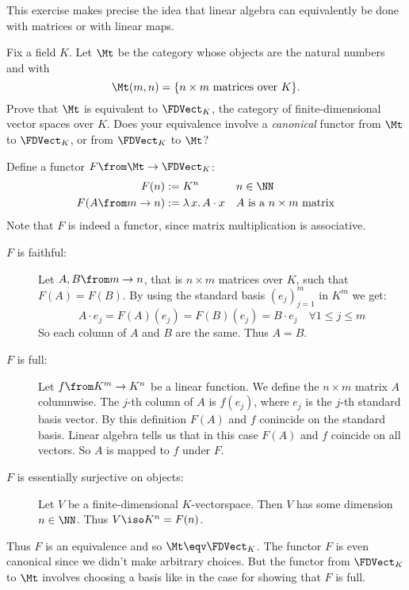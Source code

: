 \begin{exercise}
This exercise makes precise the idea that linear algebra can equivalently
be done with matrices or with linear maps.

Fix a field $K$.  Let $\Mt$ be the category whose objects are the natural
numbers and with
\[ \Mt(m, n) = \{ n \times m \text{ matrices over } K \}. \]
Prove that $\Mt$ is equivalent to $\FDVect_K$, the category of
finite-dimensional vector spaces over $K$.
Does your equivalence involve a \emph{canonical} functor from $\Mt$ to $\FDVect_K$, or from $\FDVect_K$ to $\Mt$?
\end{exercise}
\begin{answer}
    Define a functor $F\from \Mt \to \FDVect_K$:
    \begin{align*}
        F(n) & := K^n && n \in \NN\\
        F(A\from m \to n) & := \lambda\, x. \, A \cdot x && A \text{ is a } n \times m \text{ matrix}
    \end{align*}
    Note that $F$ is indeed a functor, since matrix multiplication is associative.
    \begin{description}
        \item[$F$ is faithful:]
            Let $A, B\from m \to n$, that is $n \times m$ matrices over $K$, such that $F(A) = F(B)$.
            By using the standard basis $(e_j)_{j = 1}^m$ in $K^m$ we get:
            \[A \cdot e_j = F(A)(e_j) = F(B)(e_j) = B \cdot e_j \quad\forall 1 \le j \le m\]
            So each column of $A$ and $B$ are the same.
            Thus $A = B$.
        \item[$F$ is full:]
            Let $f\from K^m \to K^n$ be a linear function.
            We define the $n \times m$ matrix $A$ columnwise.
            The $j$-th column of $A$ is $f(e_j)$, where $e_j$ is the $j$-th standard basis vector.
            By this definition $F(A)$ and $f$ conincide on the standard basis.
            Linear algebra tells us that in this case $F(A)$ and $f$ coincide on all vectors.
            So $A$ is mapped to $f$ under $F$.
        \item[$F$ is essentially surjective on objects:]
            Let $V$ be a finite-dimensional $K$-vectorspace.
            Then $V$ has some dimension $n \in \NN$.
            Thus $V \iso K^n = F(n)$.
    \end{description}
    Thus $F$ is an equivalence and so $\Mt \eqv \FDVect_K$.
    The functor $F$ is even canonical since we didn't make arbitrary choices.
    But the functor from $\FDVect_K$ to $\Mt$ involves choosing a basis like in the case for showing that $F$ is full.
\end{answer}



